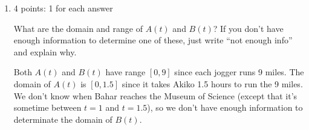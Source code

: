 \documentclass{article}
\makeatletter
\let\@href=\href
\renewcommand{\href}[2]{\@href{#1}{\ul{#2}}}
\makeatother
\begin{document}
\begin{enumerate}
\begin{enumerate}
    \begin{solution}
      Since Akiko jogs at a constant speed, she runs the same amount in each second. Using the strategy of {{\#3}} on \href{https://people.math.harvard.edu/~jjchen/mathma/docs/worksheets/worksheet01-sols.html}{the worksheet ``Introduction to Functions''}, this means the graph of her distance will be linear, and the slope will be 6 miles per hour. Bahar starts out running more slowly than Akiko but speeds up; using the strategy of {{\#3}} on \href{https://people.math.harvard.edu/~jjchen/mathma/docs/worksheets/worksheet01-sols.html}{the worksheet ``Introduction to Functions''}, this means her graph will be increasing and concave up. Finally, we know that Bahar catches up to Akiko at $t = 1$, so the graphs should cross there. (And, at that time, Akiko has run 6 miles.) 
      \begin{center}
      \end{center}
    \end{solution}

    \pspace{0.25in}

  \item \label{graph-two-runs-domain-range}

    \begin{grading}
      4 points: 1 for each answer
    \end{grading}

    \begin{problem}[\vfill\newpage]
      What are the domain and range of $A(t)$ and $B(t)$? If you don't have enough information to determine one of these, just write ``not enough info'' and explain why.
    \end{problem}

    \begin{solution}
      Both $A(t)$ and $B(t)$ have range $[0, 9]$ since each jogger runs 9 miles. The domain of $A(t)$ is $[0, 1.5]$ since it takes Akiko 1.5 hours to run the 9 miles. We don't know when Bahar reaches the Museum of Science (except that it's sometime between $t = 1$ and $t = 1.5$), so we don't have enough information to determinate the domain of $B(t)$.
    \end{solution}


\end{enumerate}
\end{enumerate}
\end{document}

